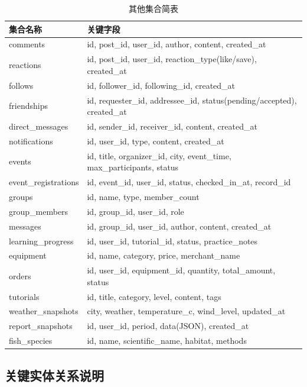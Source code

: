 \documentclass[12pt,a4paper]{ctexart}
\begin{document}
\begin{table}[H]
  \centering
  \caption{其他集合简表}
  \label{tab:other-collections}
  \begin{tabular}{p{3.5cm}p{8.5cm}}
    \toprule
    \textbf{集合名称} & \textbf{关键字段} \\
    \midrule
    comments & id, post\_id, user\_id, author, content, created\_at \\
    reactions & id, post\_id, user\_id, reaction\_type(like/save), created\_at \\
    follows & id, follower\_id, following\_id, created\_at \\
    friendships & id, requester\_id, addressee\_id, status(pending/accepted), created\_at \\
    direct\_messages & id, sender\_id, receiver\_id, content, created\_at \\
    notifications & id, user\_id, type, content, created\_at \\
    events & id, title, organizer\_id, city, event\_time, max\_participants, status \\
    event\_registrations & id, event\_id, user\_id, status, checked\_in\_at, record\_id \\
    groups & id, name, type, member\_count \\
    group\_members & id, group\_id, user\_id, role \\
    messages & id, group\_id, user\_id, author, content, created\_at \\
    learning\_progress & id, user\_id, tutorial\_id, status, practice\_notes \\
    equipment & id, name, category, price, merchant\_name \\
    orders & id, user\_id, equipment\_id, quantity, total\_amount, status \\
    tutorials & id, title, category, level, content, tags \\
    weather\_snapshots & city, weather, temperature\_c, wind\_level, updated\_at \\
    report\_snapshots & id, user\_id, period, data(JSON), created\_at \\
    fish\_species & id, name, scientific\_name, habitat, methods \\
    \bottomrule
  \end{tabular}
\end{table}

\subsection{关键实体关系说明}
\end{document}
